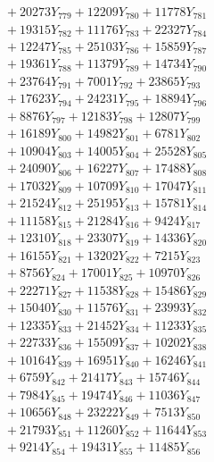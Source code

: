 \documentclass[a4paper,10pt]{article}
\begin{document}
{\begin{align}
&\;  + 20273 Y_{779} + 12209 Y_{780} + 11778 Y_{781} \\[0.3ex]
&\;  + 19315 Y_{782} + 11176 Y_{783} + 22327 Y_{784} \\[0.3ex]
&\;  + 12247 Y_{785} + 25103 Y_{786} + 15859 Y_{787} \\[0.3ex]
&\;  + 19361 Y_{788} + 11379 Y_{789} + 14734 Y_{790} \\[0.3ex]
&\;  + 23764 Y_{791} + 7001 Y_{792} + 23865 Y_{793} \\[0.3ex]
&\;  + 17623 Y_{794} + 24231 Y_{795} + 18894 Y_{796} \\[0.3ex]
&\;  + 8876 Y_{797} + 12183 Y_{798} + 12807 Y_{799} \\[0.3ex]
&\;  + 16189 Y_{800} + 14982 Y_{801} + 6781 Y_{802} \\[0.3ex]
&\;  + 10904 Y_{803} + 14005 Y_{804} + 25528 Y_{805} \\[0.3ex]
&\;  + 24090 Y_{806} + 16227 Y_{807} + 17488 Y_{808} \\[0.5ex]\allowbreak
&\;  + 17032 Y_{809} + 10709 Y_{810} + 17047 Y_{811} \\[0.3ex]
&\;  + 21524 Y_{812} + 25195 Y_{813} + 15781 Y_{814} \\[0.3ex]
&\;  + 11158 Y_{815} + 21284 Y_{816} + 9424 Y_{817} \\[0.3ex]
&\;  + 12310 Y_{818} + 23307 Y_{819} + 14336 Y_{820} \\[0.3ex]
&\;  + 16155 Y_{821} + 13202 Y_{822} + 7215 Y_{823} \\[0.3ex]
&\;  + 8756 Y_{824} + 17001 Y_{825} + 10970 Y_{826} \\[0.3ex]
&\;  + 22271 Y_{827} + 11538 Y_{828} + 15486 Y_{829} \\[0.3ex]
&\;  + 15040 Y_{830} + 11576 Y_{831} + 23993 Y_{832} \\[0.3ex]
&\;  + 12335 Y_{833} + 21452 Y_{834} + 11233 Y_{835} \\[0.3ex]
&\;  + 22733 Y_{836} + 15509 Y_{837} + 10202 Y_{838} \\[0.5ex]\allowbreak
&\;  + 10164 Y_{839} + 16951 Y_{840} + 16246 Y_{841} \\[0.3ex]
&\;  + 6759 Y_{842} + 21417 Y_{843} + 15746 Y_{844} \\[0.3ex]
&\;  + 7984 Y_{845} + 19474 Y_{846} + 11036 Y_{847} \\[0.3ex]
&\;  + 10656 Y_{848} + 23222 Y_{849} + 7513 Y_{850} \\[0.3ex]
&\;  + 21793 Y_{851} + 11260 Y_{852} + 11644 Y_{853} \\[0.3ex]
&\;  + 9214 Y_{854} + 19431 Y_{855} + 11485 Y_{856} \\[0.3ex]

\end{align}}
\end{document}
